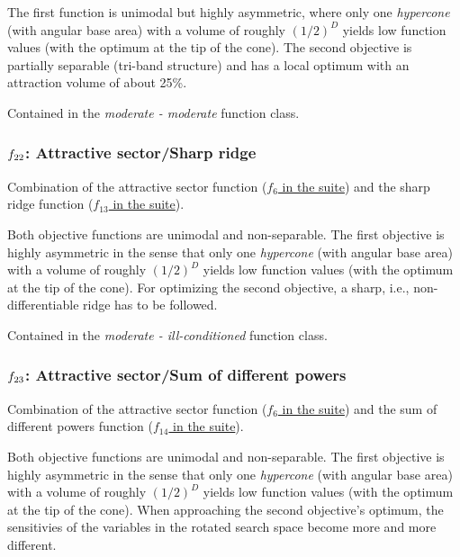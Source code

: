 \documentclass[letterpaper,12pt,english]{article}
\begin{document}
The first function is unimodal but highly asymmetric, where only one
\emph{hypercone} (with angular base area) with a volume of
roughly \((1/2)^D\) yields low function values (with the
optimum at the tip of the cone). The second
objective is partially separable (tri-band structure) and has a local
optimum with an attraction volume of about 25\%.

Contained in the \emph{moderate - moderate} function class.


\subsubsection{\protect\(f_{22}\protect\): Attractive sector/Sharp ridge}
\label{index:f22}\label{index:attractive-sector-sharp-ridge}
Combination of the attractive sector function (\href{http://coco.lri.fr/downloads/download15.03/bbobdocfunctions.pdf\#page=30}{\(f_6\) in the  suite}) and the sharp ridge function (\href{http://coco.lri.fr/downloads/download15.03/bbobdocfunctions.pdf\#page=65}{\(f_{13}\) in the  suite}).

Both objective functions are unimodal and non-separable. The
first objective is highly asymmetric in the sense that only one
\emph{hypercone} (with angular base area) with a volume of
roughly \((1/2)^D\) yields low function values (with the
optimum at the tip of the cone). For optimizing the second
objective, a sharp, i.e., non-differentiable ridge has to be followed.

Contained in the \emph{moderate - ill-conditioned} function class.


\subsubsection{\protect\(f_{23}\protect\): Attractive sector/Sum of different powers}
\label{index:f23}\label{index:attractive-sector-sum-of-different-powers}
Combination of the attractive sector function (\href{http://coco.lri.fr/downloads/download15.03/bbobdocfunctions.pdf\#page=30}{\(f_6\) in the  suite}) and the sum of different powers function
(\href{http://coco.lri.fr/downloads/download15.03/bbobdocfunctions.pdf\#page=70}{\(f_{14}\) in the  suite}).

Both objective functions are unimodal and non-separable. The
first objective is highly asymmetric in the sense that only one
\emph{hypercone} (with angular base area) with a volume of
roughly \((1/2)^D\) yields low function values (with the
optimum at the tip of the cone). When approaching the second
objective's optimum, the sensitivies of the variables in the
rotated search space become more and more different.
\end{document}
